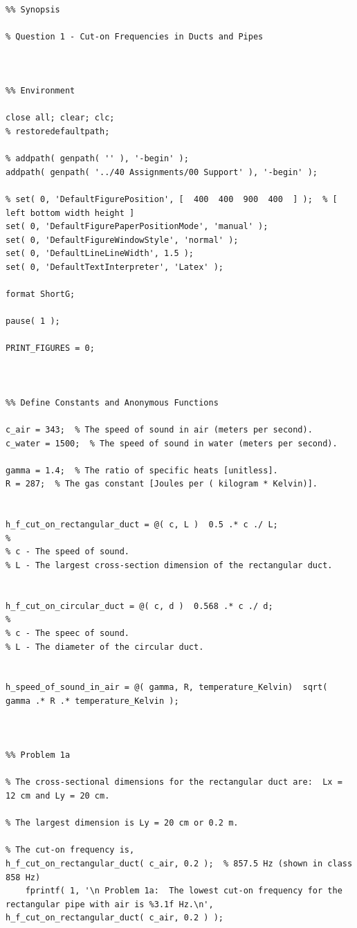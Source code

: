 \begin{lstlisting}[style=Matlab-editor, basicstyle=\fontfamily{pcr}, numbers=none, keepspaces, mlshowsectionrules, basicstyle=\footnotesize]

%% Synopsis

% Question 1 - Cut-on Frequencies in Ducts and Pipes



%% Environment

close all; clear; clc;
% restoredefaultpath;

% addpath( genpath( '' ), '-begin' );
addpath( genpath( '../40 Assignments/00 Support' ), '-begin' );

% set( 0, 'DefaultFigurePosition', [  400  400  900  400  ] );  % [ left bottom width height ]
set( 0, 'DefaultFigurePaperPositionMode', 'manual' );
set( 0, 'DefaultFigureWindowStyle', 'normal' );
set( 0, 'DefaultLineLineWidth', 1.5 );
set( 0, 'DefaultTextInterpreter', 'Latex' );

format ShortG;

pause( 1 );

PRINT_FIGURES = 0;



%% Define Constants and Anonymous Functions

c_air = 343;  % The speed of sound in air (meters per second).
c_water = 1500;  % The speed of sound in water (meters per second).

gamma = 1.4;  % The ratio of specific heats [unitless].
R = 287;  % The gas constant [Joules per ( kilogram * Kelvin)].


h_f_cut_on_rectangular_duct = @( c, L )  0.5 .* c ./ L;
%
% c - The speed of sound.
% L - The largest cross-section dimension of the rectangular duct.


h_f_cut_on_circular_duct = @( c, d )  0.568 .* c ./ d;
%
% c - The speec of sound.
% L - The diameter of the circular duct.


h_speed_of_sound_in_air = @( gamma, R, temperature_Kelvin)  sqrt( gamma .* R .* temperature_Kelvin );



%% Problem 1a

% The cross-sectional dimensions for the rectangular duct are:  Lx = 12 cm and Ly = 20 cm.

% The largest dimension is Ly = 20 cm or 0.2 m.

% The cut-on frequency is,
h_f_cut_on_rectangular_duct( c_air, 0.2 );  % 857.5 Hz (shown in class 858 Hz)
    fprintf( 1, '\n Problem 1a:  The lowest cut-on frequency for the rectangular pipe with air is %3.1f Hz.\n', h_f_cut_on_rectangular_duct( c_air, 0.2 ) );




\end{lstlisting}
